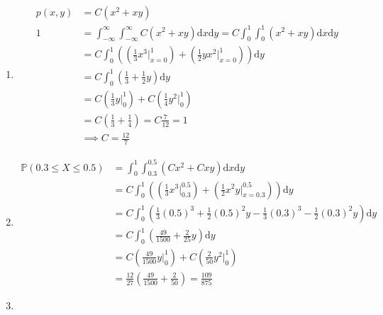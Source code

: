 \begin{enumerate}[label=\alph*.]
\item
\begin{align*}
p(x, y) &= C(x^2 + xy) \\
1 &= \int_{-\infty}^{\infty} \int_{-\infty}^{\infty} C (x^2 + xy) \mathrm d x \mathrm d y = C \int_0^1 \int_0^1 (x^2 + xy) \mathrm d x \mathrm d y \\
&= C \int_0^1 \left( \left( \frac{1}{3} x^3\Big|_{x=0}^1 \right) + \left( \frac{1}{2} y x^2 \Big|_{x=0}^1 \right) \right) \mathrm d y \\
&= C \int_0^1 \left(\frac{1}{3} +\frac{1}{2} y \right) \mathrm d y \\
&= C \left(\frac{1}{3}y \Big|_0^1\right) + C \left(\frac{1}{4} y^2 \Big|_0^1 \right) \\
&= C \left( \frac{1}{3} + \frac{1}{4} \right) = C \frac{7}{12} = 1\\
&\implies C = \frac{12}{7}
\end{align*}
\item
\begin{align*}
\mathbb{P}(0.3 \leq X \leq 0.5) &= \int_0^1 \int_{0.3}^{0.5} \left(Cx^2 + Cxy\right) \mathrm d x \mathrm d y \\
&= C \int_0^1 \left(\left(\frac{1}{3}x^3 \Big|_{0.3}^{0.5} \right) + \left( \frac{1}{2}x^2 y \Big|_{x=0.3}^{0.5} \right) \right) \mathrm d y \\
&= C \int_0^1 \left(\frac{1}{3}(0.5)^3 + \frac{1}{2}(0.5)^2 y - \frac{1}{3}(0.3)^3 - \frac{1}{2}(0.3)^2 y \right) \mathrm d y \\
&= C \int_0^1 \left(\frac{49}{1500} + \frac{2}{25} y \right) \mathrm d y \\
&= C \left( \frac{49}{1500}y \Big|_0^1 \right) + C \left( \frac{2}{50} y^2 \Big|_0^1 \right) \\
&= \frac{12}{27}\left(\frac{49}{1500} + \frac{2}{50} \right) = \frac{109}{875}
\end{align*}
\item


\end{enumerate}
